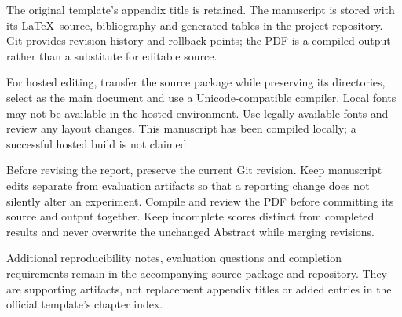 The original template's appendix title is retained. The manuscript is stored with its \LaTeX\ source, bibliography and generated tables in the project repository. Git provides revision history and rollback points; the PDF is a compiled output rather than a substitute for editable source.

For hosted editing, transfer the source package while preserving its directories, select  as the main document and use a Unicode-compatible compiler. Local fonts may not be available in the hosted environment. Use legally available fonts and review any layout changes. This manuscript has been compiled locally; a successful hosted build is not claimed.

Before revising the report, preserve the current Git revision. Keep manuscript edits separate from evaluation artifacts so that a reporting change does not silently alter an experiment. Compile and review the PDF before committing its source and output together. Keep incomplete scores distinct from completed results and never overwrite the unchanged Abstract while merging revisions.

Additional reproducibility notes, evaluation questions and completion requirements remain in the accompanying source package and repository. They are supporting artifacts, not replacement appendix titles or added entries in the official template's chapter index.
